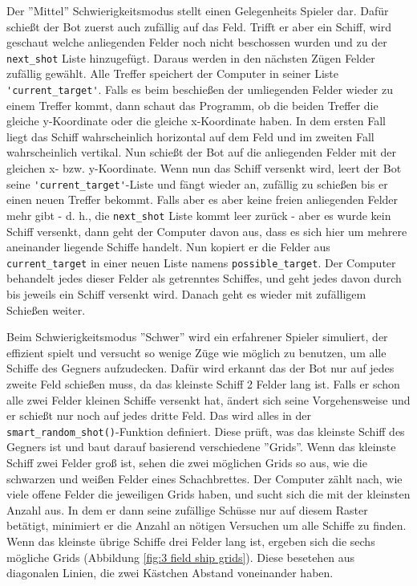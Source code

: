 \documentclass{article}
\begin{document}
\par
    Der ''Mittel'' Schwierigkeitsmodus stellt einen Gelegenheits Spieler dar. Dafür schießt der Bot zuerst auch zufällig auf das Feld. Trifft er aber ein Schiff, wird geschaut welche anliegenden Felder noch nicht beschossen wurden und zu der \verb$next_shot$ Liste hinzugefügt. Daraus werden in den nächsten Zügen Felder zufällig gewählt. Alle Treffer speichert der Computer in seiner Liste \verb$'current_target'$. Falls es beim beschießen der umliegenden Felder wieder zu einem Treffer kommt, dann schaut das Programm, ob die beiden Treffer die gleiche y-Koordinate oder die gleiche x-Koordinate haben. In dem ersten Fall liegt das Schiff wahrscheinlich horizontal auf dem Feld und im zweiten Fall wahrscheinlich vertikal. Nun schießt der Bot auf die anliegenden Felder mit der gleichen x- bzw. y-Koordinate. Wenn nun das Schiff versenkt wird, leert der Bot seine \verb$'current_target'$-Liste und fängt wieder an, zufällig zu schießen bis er einen neuen Treffer bekommt. Falls aber es aber keine freien anliegenden Felder mehr gibt - d. h., die \verb$next_shot$ Liste kommt leer zurück - aber es wurde kein Schiff versenkt, dann geht der Computer davon aus, dass es sich hier um mehrere aneinander liegende Schiffe handelt. Nun kopiert er die Felder aus \verb$current_target$ in einer neuen Liste namens \verb$possible_target$. Der Computer behandelt jedes dieser Felder als getrenntes Schiffes, und geht jedes davon durch bis jeweils ein Schiff versenkt wird. Danach geht es wieder mit zufälligem Schießen weiter.\\

\par
    Beim Schwierigkeitsmodus ''Schwer'' wird ein erfahrener Spieler simuliert, der effizient spielt und versucht so wenige Züge wie möglich zu benutzen, um alle Schiffe des Gegners aufzudecken. Dafür wird erkannt das der Bot nur auf jedes zweite Feld schießen muss, da das kleinste Schiff 2 Felder lang ist. Falls er schon alle zwei Felder kleinen Schiffe versenkt hat, ändert sich seine Vorgehensweise und er schießt nur noch auf jedes dritte Feld. Das wird alles in der \verb$smart_random_shot()$-Funktion definiert. Diese prüft, was das kleinste Schiff des Gegners ist und baut darauf basierend verschiedene ''Grids''. Wenn das kleinste Schiff zwei Felder groß ist, sehen die zwei möglichen Grids so aus, wie die schwarzen und weißen Felder eines Schachbrettes. Der Computer zählt nach, wie viele offene Felder die jeweiligen Grids haben, und sucht sich die mit der kleinsten Anzahl aus. In dem er dann seine zufällige Schüsse nur auf diesem Raster betätigt, minimiert er die Anzahl an nötigen Versuchen um alle Schiffe zu finden. Wenn das kleinste übrige Schiffe drei Felder lang ist, ergeben sich die sechs mögliche Grids (Abbildung \ref{fig:3 field ship grids}). Diese besetehen aus diagonalen Linien, die zwei Kästchen Abstand voneinander haben.
\end{document}
